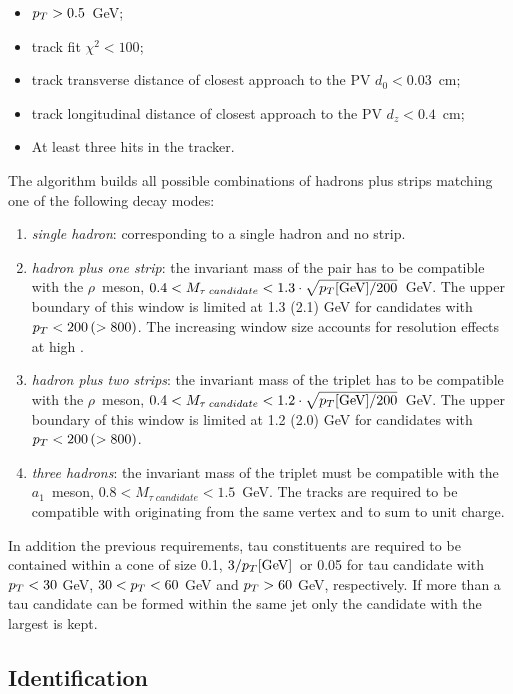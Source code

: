 \begin{itemize}
\item $p_{T} > 0.5$\ GeV;
\item track fit $\chi^2 < 100$;
\item track transverse distance of closest approach to the PV $d_0 < 0.03$\ cm;
\item track longitudinal distance of closest approach to the PV $d_z < 0.4$\ cm;
\item At least three hits in the tracker.
\end{itemize}

The algorithm builds all possible combinations of hadrons plus strips matching one of the following decay modes:

\begin{enumerate}
\item \emph{single hadron}: corresponding to a single hadron and no strip.
\item \emph{hadron plus one strip}: the invariant mass of the pair has to be compatible with the $\rho$\ meson, $0.4 < M_{\tau \; candidate} < 1.3 \cdot \sqrt{p_{T} \mathrm{[GeV]} / 200}$\ GeV. The upper boundary of this window is limited at 1.3 (2.1) GeV for candidates with $p_{T} < 200 \, (> 800)$. The increasing window size accounts for resolution effects at high \pT.
\item \emph{hadron plus two strips}: the invariant mass of the triplet has to be compatible with the $\rho$\ meson, $0.4 < M_{\tau \; candidate} < 1.2 \cdot \sqrt{p_{T} \mathrm{[GeV]} / 200}$\ GeV. The upper boundary of this window is limited at 1.2 (2.0) GeV for candidates with $p_{T} < 200 \, (> 800)$.
\item \emph{three hadrons}: the invariant mass of the triplet must be compatible with the $a_1$\ meson, $0.8 < M_{\tau \; candidate} < 1.5$\ GeV. The tracks are required to be compatible with originating from the same vertex and to sum to unit charge.
\end{enumerate}

In addition the previous requirements, tau constituents are required to be contained within a cone of size 0.1, $3 / p_{T} \mathrm{[GeV]}$\ or 0.05 for tau candidate with $p_{T} < 30$ GeV, $30 < p_{T} < 60$ GeV and $p_{T} > 60$ GeV, respectively. If more than a tau candidate can be formed within the same jet only the candidate with the largest \pT is kept.

\subsection{Identification}

